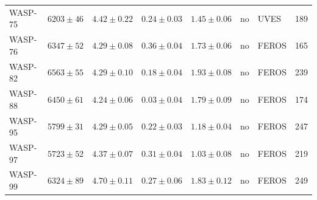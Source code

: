 \documentclass{aa}
\begin{document}
\begin{table}[htb!]
\begin{tabular}{llllllll}
      WASP-75     &  $6203 \pm  46$      &  $4.42 \pm 0.22$    &  $ 0.24 \pm 0.03$    &  $1.45 \pm 0.06$             &             no              & UVES         &  189  \\  %
      WASP-76     &  $6347 \pm  52$      &  $4.29 \pm 0.08$    &  $ 0.36 \pm 0.04$    &  $1.73 \pm 0.06$             &             no              & FEROS        &  165  \\  %
      WASP-82     &  $6563 \pm  55$      &  $4.29 \pm 0.10$    &  $ 0.18 \pm 0.04$    &  $1.93 \pm 0.08$             &             no              & FEROS        &  239  \\  %
      WASP-88     &  $6450 \pm  61$      &  $4.24 \pm 0.06$    &  $ 0.03 \pm 0.04$    &  $1.79 \pm 0.09$             &             no              & FEROS        &  174  \\  %
      WASP-95     &  $5799 \pm  31$      &  $4.29 \pm 0.05$    &  $ 0.22 \pm 0.03$    &  $1.18 \pm 0.04$             &             no              & FEROS        &  247  \\  %
      WASP-97     &  $5723 \pm  52$      &  $4.37 \pm 0.07$    &  $ 0.31 \pm 0.04$    &  $1.03 \pm 0.08$             &             no              & FEROS        &  219  \\  %
      WASP-99     &  $6324 \pm  89$      &  $4.70 \pm 0.11$    &  $ 0.27 \pm 0.06$    &  $1.83 \pm 0.12$             &             no              & FEROS        &  249  \\  %

\end{tabular}
\end{table}
\end{document}
